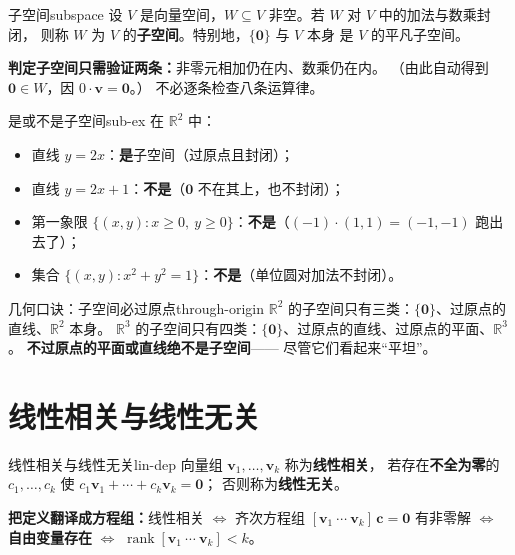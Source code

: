 \documentclass[11pt,a4paper,openany]{ctexbook}
\DeclareMathOperator{\rank}{rank}
\newcommand{\Rnum}[1]{\mathbb{R}^{#1}}
\begin{document}
\begin{defn}{子空间}{subspace}
设 $V$ 是向量空间，$W\subseteq V$ 非空。若 $W$ 对 $V$ 中的加法与数乘封闭，
则称 $W$ 为 $V$ 的\textbf{子空间}。特别地，$\{\boldsymbol{0}\}$ 与 $V$ 本身
是 $V$ 的平凡子空间。
\end{defn}

\begin{keypoint}
\textbf{判定子空间只需验证两条：}非零元相加仍在内、数乘仍在内。
（由此自动得到 $\boldsymbol{0}\in W$，因 $0\cdot\boldsymbol{v}=\boldsymbol{0}$。）
不必逐条检查八条运算律。
\end{keypoint}

\begin{exmp}{是或不是子空间}{sub-ex}
在 $\Rnum{2}$ 中：
\begin{itemize}[itemsep=1pt]
\item 直线 $y=2x$：\textbf{是}子空间（过原点且封闭）；
\item 直线 $y=2x+1$：\textbf{不是}（$\boldsymbol{0}$ 不在其上，也不封闭）；
\item 第一象限 $\{(x,y):x\ge0,\ y\ge0\}$：\textbf{不是}（$(-1)\cdot(1,1)=(-1,-1)$ 跑出去了）；
\item 集合 $\{(x,y):x^2+y^2=1\}$：\textbf{不是}（单位圆对加法不封闭）。
\end{itemize}
\end{exmp}

\begin{remk}{几何口诀：子空间必过原点}{through-origin}
$\Rnum{2}$ 的子空间只有三类：$\{\boldsymbol{0}\}$、过原点的直线、$\Rnum{2}$ 本身。
$\Rnum{3}$ 的子空间只有四类：$\{\boldsymbol{0}\}$、过原点的直线、过原点的平面、$\Rnum{3}$。
\textbf{不过原点的平面或直线绝不是子空间}——
尽管它们看起来“平坦”。
\end{remk}

\section{线性相关与线性无关}

\begin{defn}{线性相关与线性无关}{lin-dep}
向量组 $\boldsymbol{v}_1,\dots,\boldsymbol{v}_k$ 称为\textbf{线性相关}，
若存在\textbf{不全为零}的 $c_1,\dots,c_k$ 使
$c_1\boldsymbol{v}_1+\cdots+c_k\boldsymbol{v}_k=\boldsymbol{0}$；
否则称为\textbf{线性无关}。
\end{defn}

\begin{keypoint}
\textbf{把定义翻译成方程组：}线性相关 $\Leftrightarrow$
齐次方程组 $[\boldsymbol{v}_1\ \cdots\ \boldsymbol{v}_k]\,\boldsymbol{c}=\boldsymbol{0}$
有非零解 $\Leftrightarrow$ \textbf{自由变量存在} $\Leftrightarrow$
$\rank[\boldsymbol{v}_1\ \cdots\ \boldsymbol{v}_k]<k$。
\end{keypoint}
\end{document}
